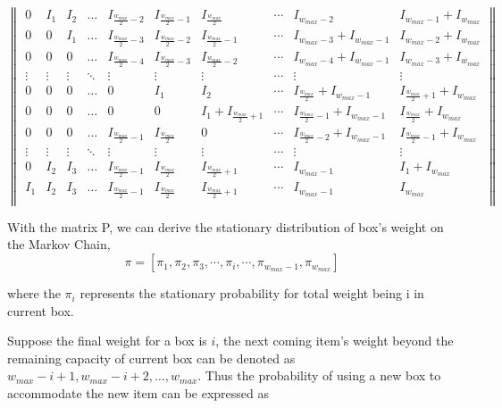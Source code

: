 \documentclass{article}
\begin{document}
\[
\begin{Vmatrix}
0 & I_1 & I_2 & \dots & I_{{\frac{w_{max}}{2}}-2} & I_{{\frac{w_{max}}{2}}-1} & I_{{\frac{w_{max}}{2}}} &\cdots & I_{w_{max}-2} & I_{w_{max}-1}+I_{w_{max}}\\
0 & 0 & I_1 & \dots & I_{{\frac{w_{max}}{2}}-3} & I_{{\frac{w_{max}}{2}}-2} & I_{{\frac{w_{max}}{2}}-1} &\cdots & I_{w_{max}-3}+I_{w_{max}-1} & I_{w_{max}-2}+I_{w_{max}}\\
0 & 0 & 0 & \dots & I_{{\frac{w_{max}}{2}}-4} & I_{{\frac{w_{max}}{2}}-3} & I_{{\frac{w_{max}}{2}}-2} &\cdots & I_{w_{max}-4}+I_{w_{max}-1} & I_{w_{max}-3}+I_{w_{max}}\\
\vdots & \vdots & \vdots & \ddots & \vdots & \vdots & \vdots & \cdots & \vdots & \vdots\\
0 & 0 & 0 & \dots & 0 & I_1 & I_2 &\cdots & I_{\frac{w_{max}}{2}}+I_{w_{max}-1} & I_{\frac{w_{max}}{2}+1}+I_{w_{max}}\\
0 & 0 & 0 & \dots & 0 & 0 & I_1+I_{\frac{w_{max}}{2}+1} &\cdots & I_{\frac{w_{max}}{2}-1}+I_{w_{max}-1} & I_{\frac{w_{max}}{2}}+I_{w_{max}}\\
0 & 0 & 0 & \dots & I_{\frac{w_{max}}{2}-1} & I_{\frac{w_{max}}{2}} & 0 &\cdots & I_{\frac{w_{max}}{2}-2}+I_{w_{max}-1} & I_{\frac{w_{max}}{2}-1}+I_{w_{max}}\\
\vdots & \vdots & \vdots & \ddots & \vdots & \vdots & \vdots & \cdots & \vdots & \vdots\\
0 & I_2 & I_3 & \dots & I_{\frac{w_{max}}{2}-1} & I_{\frac{w_{max}}{2}} & I_{\frac{w_{max}}{2}+1}  &\cdots & I_{w_{max}-1} & I_1+I_{w_{max}}\\
I_1 & I_2 & I_3 & \dots & I_{\frac{w_{max}}{2}-1} & I_{\frac{w_{max}}{2}} & I_{\frac{w_{max}}{2}+1}  &\cdots & I_{w_{max}-1} & I_{w_{max}}\\
\end{Vmatrix}
\]

With the matrix P, we can derive the stationary distribution of box's weight on the Markov Chain,
\begin{equation}
\pi=[\pi_{1},\pi_{2},\pi_{3},\cdots,\pi_i,\cdots,\pi_{w_{max}-1},\pi_{w_{max}}]
\end{equation}

where the $\pi_i$ represents the stationary probability for total weight being i in current box.

Suppose the final weight for a box is $i$, the next coming item's weight beyond the remaining capacity of current box can be denoted as $w_{max}-i+1,w_{max}-i+2,\dots,w_{max}$. Thus the probability of using a new box to accommodate the new item can be expressed as 
\end{document}
